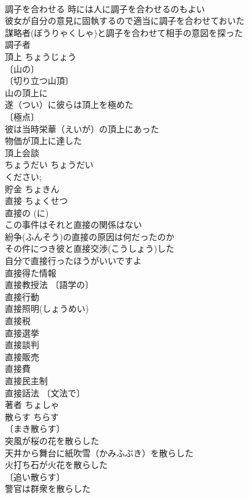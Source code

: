 \documentclass[8pt]{extreport}
\begin{document}
\begin{CJK}{UTF8}{min}
\\	調子を合わせる 時には人に調子を合わせるのもよい 
\\	彼女が自分の意見に固執するので適当に調子を合わせておいた 
\\	謀略者(ぼうりゃくしゃ)と調子を合わせて相手の意図を探った 
\\	調子者 
\\	頂上	ちょうじょう	
\\	〔山の〕
\\	〔切り立つ山頂〕
\\	山の頂上に 
\\	遂（つい）に彼らは頂上を極めた 
\\	〔極点〕
\\	彼は当時栄華（えいが）の頂上にあった 
\\	物価が頂上に達した 
\\	頂上会談 
\\	ちょうだい	ちょうだい	
\\	ください; 
\\	貯金	ちょきん	
\\	直接	ちょくせつ	
\\	直接の (に) 
\\	この事件はそれと直接の関係はない 
\\	紛争(ふんそう)の直接の原因は何だったのか 
\\	その件につき彼と直接交渉(こうしょう)した 
\\	自分で直接行ったほうがいいですよ 
\\	直接得た情報 
\\	直接教授法 〔語学の〕
\\	直接行動 
\\	直接照明(しょうめい) 
\\	直接税 
\\	直接選挙 
\\	直接談判 
\\	直接販売 
\\	直接費 
\\	直接民主制 
\\	直接話法 〔文法で〕
\\	著者	ちょしゃ	
\\	散らす	ちらす	
\\	〔まき散らす〕
\\	突風が桜の花を散らした 
\\	天井から舞台に紙吹雪（かみふぶき）を散らした 
\\	火打ち石が火花を散らした 
\\	〔追い散らす〕
\\	警官は群衆を散らした 

\end{CJK}
\end{document}
